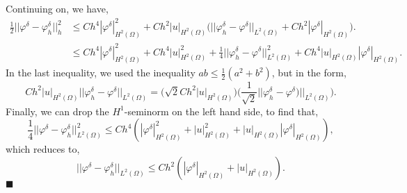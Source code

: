 \documentclass[11pt]{article}
\newcommand{\phid}{\varphi^\delta}
\begin{document}
Continuing on, we have,
\begin{align*}
    	\frac12 ||\phid - \phid_h||^2_h &\leq Ch^4|\phid|^2_{H^2(\Omega)} + Ch^2|u|_{H^2(\Omega)} \big(||\varphi_h^\delta - \phid||_{L^2(\Omega)} + Ch^2 |\phid|_{H^2(\Omega)}\big). \\
	&\leq Ch^4|\phid|^2_{H^2(\Omega)} + Ch^4|u|^2_{H^2(\Omega)} + \frac{1}{4}||\varphi_h^\delta - \phid||^2_{L^2(\Omega)} + Ch^4|u|_{H^2(\Omega)} |\phid|_{H^2(\Omega)}.
\end{align*}
In the last inequality, we used the inequality $ab \leq \frac{1}{2}(a^2 + b^2)$, but in the form,
\begin{equation*}
    	Ch^2|u|_{H^2(\Omega)}||\phid_h - \phid||_{L^2(\Omega)} = \big( \sqrt{2}Ch^2 |u|_{H^2(\Omega)} \big) \big(\frac{1}{\sqrt{2}}||\phid_h - \phid)||_{L^2(\Omega)}\big).
\end{equation*}
Finally, we can drop the $H^1$-seminorm on the left hand side, to find that,
\begin{equation*}
    	\frac{1}{4}||\varphi^\delta - \varphi^\delta_h||^2_{L^2(\Omega)} \leq Ch^4(|\varphi^\delta|^2_{H^2(\Omega)} + |u|^2_{H^2(\Omega)} + |u|_{H^2(\Omega)}|\varphi^\delta|_{H^2(\Omega)}),
\end{equation*}
which reduces to,
\begin{equation*}
	||\varphi^\delta - \varphi^\delta_h||_{L^2(\Omega)} \leq Ch^2 (|\varphi^\delta|_{H^2(\Omega)} + |u|_{H^2(\Omega)}).
\end{equation*}
$\blacksquare$


\vskip 2cm
\end{document}
